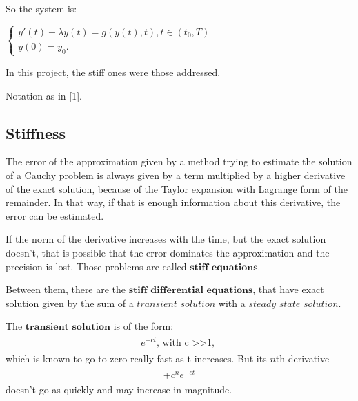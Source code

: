 \documentclass[letterpaper,10pt,english]{jupyterBook}
\begin{document}
\sphinxAtStartPar
So the system is:

\sphinxAtStartPar
\(\begin{cases}
    y'(t) + \lambda y(t) = g(y(t), t), t \in (t_0, T) \\
    y(0) = y_0 
    \text{.}
\end{cases}\)

\sphinxAtStartPar
In this project, the stiff ones were those addressed.

\sphinxAtStartPar
Notation as in {[}1{]}.


\subsection{Stiffness}
\label{\detokenize{cap1:stiffness}}
\sphinxAtStartPar
The error of the approximation given by a method trying to estimate the solution of a Cauchy problem is always given by a term multiplied by a higher derivative of the exact solution, because of the Taylor expansion with Lagrange form of the remainder. In that way, if that is enough information about this derivative, the error can be estimated.

\sphinxAtStartPar
If the norm of the derivative increases with the time, but the exact solution doesn’t, that is possible that the error dominates the approximation and the precision is lost. Those problems are called \(\textbf{stiff equations}\).

\sphinxAtStartPar
Between them, there are the \(\textbf{stiff differential equations}\), that have exact solution given by the sum of a \(\textit{transient solution}\) with a \(\textit{steady state solution}\).

\sphinxAtStartPar
The \(\textbf{transient solution}\) is of the form:
\begin{equation*}
\begin{split}
\begin{align*}
    e^{-ct} \text{, with c >>1, }
\end{align*}
\end{split}
\end{equation*}
\sphinxAtStartPar
which is known to go to zero really fast as t increases. But its \(n\)th derivative
\begin{equation*}
\begin{split}
\begin{align*}
    \mp c^{n}e^{-ct}
\end{align*}
\end{split}
\end{equation*}
\sphinxAtStartPar
doesn’t go as quickly and may increase in magnitude.
\end{document}

